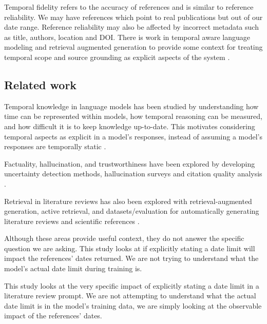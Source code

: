 \documentclass[manuscript]{acmart}
\begin{document}
Temporal fidelity refers to the accuracy of references and is similar to reference reliability. We may have references which point to real publications but out of our date range. Reference reliability may also be affected by incorrect metadata such as title, authors, location and DOI. There is work in temporal aware language modeling and retrieval augmented generation to provide some context for treating temporal scope and source grounding as explicit aspects of the system \cite{dhingra2022timeaware,lewis2020rag}.

\subsection{Related work}
Temporal knowledge in language models has been studied by understanding how time can be represented within models, how temporal reasoning can be measured, and how difficult it is to keep knowledge up-to-date. This motivates considering temporal aspects as explicit in a model's responses, instead of assuming a model's responses are temporally static \cite{dhingra2022timeaware,cheng2024dated,wu2024continual,tan2023temporal,zhang2025time,pezik2025llmlagbench,prior2026oldfriend,zhang2026tempo}.

Factuality, hallucination, and trustworthiness have been explored by developing uncertainty detection methods, hallucination surveys and citation quality analysis \cite{farquhar2024entropy,gao2023rag,huang2025hallucination,kalai2025hallucinate,wang2024editing,chelli2024hallucination}.

Retrieval in literature reviews has also been explored with retrieval-augmented generation, active retrieval, and datasets/evaluation for automatically generating literature reviews and scientific references \cite{asai2024selfrag,jiang2023active,kasanishi2023scireviewgen,chen2025systematic,ramirez2025multi,scherbakov2025review,tang2025review,wu2025review}.

Although these areas provide useful context, they do not answer the specific question we are asking. This study looks at if explicitly stating a date limit will impact the references' dates returned. We are not trying to understand what the model's actual date limit during training is.

This study looks at the very specific impact of explicitly stating a date limit in a literature review prompt. We are not attempting to understand what the actual date limit is in the model's training data, we are simply looking at the observable impact of the references' dates.
\end{document}
